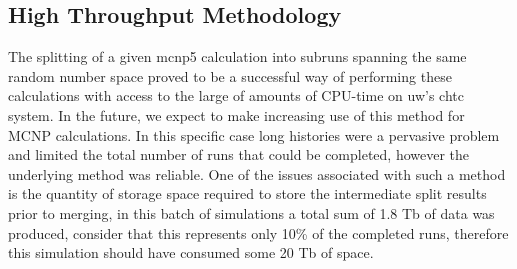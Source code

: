 \documentclass[12pt]{article}
\begin{document}
\subsection*{High Throughput Methodology}
The splitting of a given \gls{mcnp5} calculation into subruns spanning the same random
number space proved to be a successful way of performing these calculations with
access to the large of amounts of CPU-time on \gls{uw}'s \gls{chtc} system. In
the future, we expect to make increasing use of this method for MCNP
calculations. In this specific case long histories were a pervasive problem and
limited the total number of runs that could be completed, however the underlying
method was reliable. One of the issues associated with such a method is the
quantity of storage space required to store the intermediate split results prior
to merging, in this batch of simulations a total sum of 1.8 Tb of data was
produced, consider that this represents only 10\% of the completed runs,
therefore this simulation should have consumed some 20 Tb of space.
\end{document}
